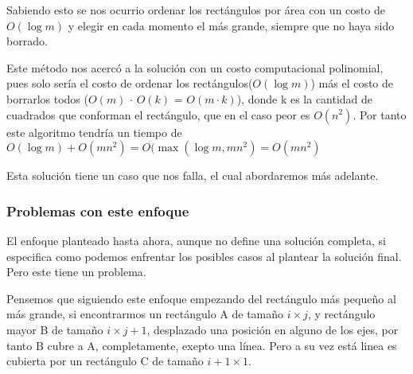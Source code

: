 \documentclass{article}
\begin{document}
Sabiendo esto se nos ocurrio ordenar los rectángulos por área con un costo de $O(\log m)$ y elegir en cada momento el más grande, siempre que no haya sido borrado.


Este método nos acercó a la solución con un costo computacional polinomial, pues solo sería el costo de ordenar los rectángulos($O(\log m)$) más el costo de borrarlos todos ($O(m)$ $\cdot$ $O(k)$ = $O(m \cdot k)$), donde k es la cantidad de cuadrados que conforman el rectángulo, que en el caso peor es $O(n^2)$. Por tanto este algoritmo tendría un tiempo de $O(\log m) + O(mn^2) = O(\max(\log m, mn^2) = O(mn^2)$

Esta solución tiene un caso que nos falla, el cual abordaremos más adelante.
	\subsubsection{Problemas con este enfoque}
	
	El enfoque planteado hasta ahora, aunque no define una solución completa, si especifica como podemos enfrentar los posibles casos al plantear la solución final. Pero este tiene un problema.

Pensemos que siguiendo este enfoque empezando del rectángulo más pequeño al más grande, si encontrarmos un rectángulo A de tamaño $i \times j$, y rectángulo mayor B de tamaño $i \times j + 1$, desplazado una posición en alguno de los ejes, por tanto B cubre a A, completamente, exepto una línea. Pero a su vez está linea es cubierta por un rectángulo C de tamaño $i + 1 \times 1$.  \\

\begin{center}


\end{center}
\end{document}
